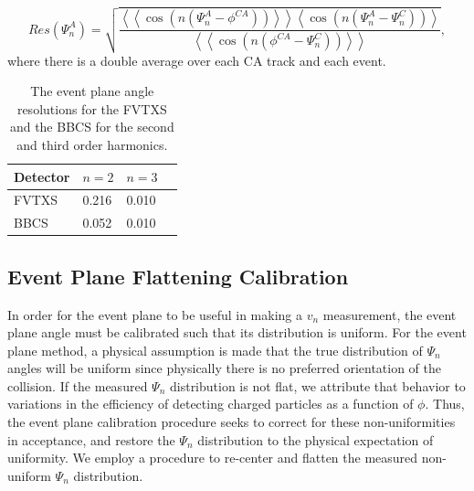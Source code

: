\begin{equation}
Res(\Psi_n^A) = \sqrt{\frac{\left<\left<\cos(n(\Psi_n^A - \phi^{CA}))\right>\right>\left<\cos(n(\Psi_n^A - \Psi_n^C))\right>}{\left<\left<\cos(n(\phi^{CA} - \Psi_n^C))\right>\right>}},
\end{equation}
where there is a double average over each CA track and each event.
\begin{table}[h!]
\caption{The event plane angle resolutions for the FVTXS and the BBCS for the second and third order harmonics.}
\begin{center}
    \begin{tabular}{| l | l | l | l |}
    \hline
    Detector & $n=2$ & $n=3$  \\ \hline
    FVTXS & 0.216 & 0.010 \\ \hline
    BBCS & 0.052 & 0.010  \\ \hline
    \end{tabular}
\end{center}
\label{tbl:std_resolutions}
\end{table}

\subsection{Event Plane Flattening Calibration}
In order for the event plane to be useful in making a $v_n$ measurement, the event plane angle must be calibrated such that its distribution is uniform. For the event plane method, a physical assumption is made that the true distribution of $\Psi_n$ angles will be uniform since physically there is no preferred orientation of the collision. If the measured $\Psi_n$ distribution is not flat, we attribute that behavior to variations in the efficiency of detecting charged particles as a function of $\phi$. Thus, the event plane calibration procedure seeks to correct for these non-uniformities in acceptance, and restore the $\Psi_n$ distribution to the physical expectation of uniformity. We employ a procedure to re-center and flatten the measured non-uniform $\Psi_n$ distribution.

